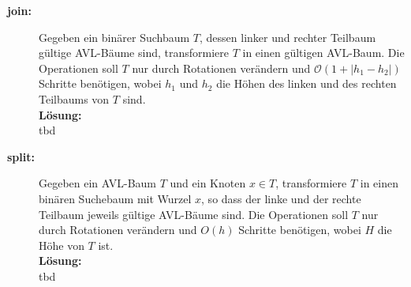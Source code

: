 \documentclass[11pt,a4paper,ngerman]{article}
\begin{document}
\begin{description}

\item[\bfseries join:] Gegeben ein binärer Suchbaum $T$, dessen linker und rechter Teilbaum gültige AVL-Bäume sind, transformiere $T$ in einen gültigen AVL-Baum. Die Operationen soll $T$ nur durch Rotationen verändern und $\mathcal{O}(1 + | h_1 - h_2|)$ Schritte benötigen, wobei $h_1$ und $h_2$ die Höhen des linken und des rechten Teilbaums von $T$ sind.\\

\noindent\textbf{Lösung:}\\

tbd

\item[\bfseries split:] Gegeben ein AVL-Baum $T$ und ein Knoten $x \in T$, transformiere $T$ in einen binären Suchebaum mit Wurzel $x$, so dass der linke und der rechte Teilbaum jeweils gültige AVL-Bäume sind. Die Operationen soll $T$ nur durch Rotationen verändern und $O(h)$ Schritte benötigen, wobei $H$ die Höhe von $T$ ist.\\

\noindent\textbf{Lösung:}\\

tbd

\end{description}

\label{LastPage}
\end{document}
